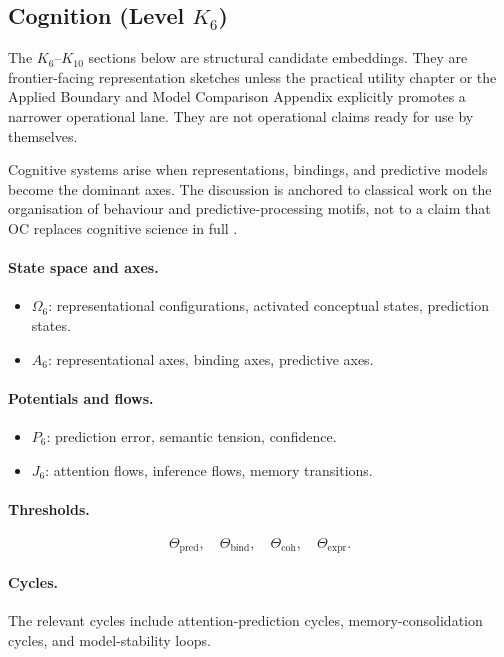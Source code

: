 \subsection{Cognition (Level \texorpdfstring{$K_6$}{K6})}

The \(K_6\)--\(K_{10}\) sections below are structural candidate embeddings.
They are frontier-facing representation sketches unless
the practical utility chapter or
the Applied Boundary and Model Comparison Appendix explicitly promotes a
narrower operational lane. They are not operational claims ready for use by
themselves.

Cognitive systems arise when representations, bindings, and predictive models
become the dominant axes.
The discussion is anchored to classical work on the organisation of behaviour and
predictive-processing motifs, not to a claim that OC replaces cognitive
science in full \parencite{hebb_organization,friston_free_energy}.

\paragraph{State space and axes.}
\begin{itemize}
  \item \(\Omega_6\): representational configurations, activated conceptual
        states, prediction states.
  \item \(A_6\): representational axes, binding axes, predictive axes.
\end{itemize}

\paragraph{Potentials and flows.}
\begin{itemize}
  \item \(P_6\): prediction error, semantic tension, confidence.
  \item \(J_6\): attention flows, inference flows, memory transitions.
\end{itemize}

\paragraph{Thresholds.}
\[
  \Theta_{\mathrm{pred}},\quad
  \Theta_{\mathrm{bind}},\quad
  \Theta_{\mathrm{coh}},\quad
  \Theta_{\mathrm{expr}}.
\]

\paragraph{Cycles.}
The relevant cycles include attention-prediction cycles, memory-consolidation
cycles, and model-stability loops.

